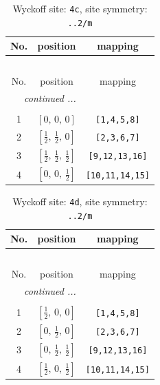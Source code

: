 \documentclass[fleqn,8pt]{jsarticle}
\begin{document}
\renewcommand{\arraystretch}{1.2}
\begin{longtable}{ccc}
\caption{Wyckoff site: {\tt 4c}, site symmetry: {\tt ..2/m}}
 \\
 \hline \hline
No. & position & mapping \\ \hline \endfirsthead

\multicolumn{2}{l}{\tablename\ \thetable{}} \\
 \hline \hline
No. & position & mapping \\ \hline \endhead

 \hline \hline
\multicolumn{2}{r}{\footnotesize\it continued ...} \\ \endfoot

 \hline \hline
\multicolumn{2}{r}{} \\ \endlastfoot

1 & $\left[ 0,\, 0,\, 0 \right]$ & {\tt [1,4,5,8]} \\ \hline
2 & $\left[ \frac{1}{2},\, \frac{1}{2},\, 0 \right]$ & {\tt [2,3,6,7]} \\ \hline
3 & $\left[ \frac{1}{2},\, \frac{1}{2},\, \frac{1}{2} \right]$ & {\tt [9,12,13,16]} \\ \hline
4 & $\left[ 0,\, 0,\, \frac{1}{2} \right]$ & {\tt [10,11,14,15]} \\
\end{longtable}
\renewcommand{\arraystretch}{1.2}
\begin{longtable}{ccc}
\caption{Wyckoff site: {\tt 4d}, site symmetry: {\tt ..2/m}}
 \\
 \hline \hline
No. & position & mapping \\ \hline \endfirsthead

\multicolumn{2}{l}{\tablename\ \thetable{}} \\
 \hline \hline
No. & position & mapping \\ \hline \endhead

 \hline \hline
\multicolumn{2}{r}{\footnotesize\it continued ...} \\ \endfoot

 \hline \hline
\multicolumn{2}{r}{} \\ \endlastfoot

1 & $\left[ \frac{1}{2},\, 0,\, 0 \right]$ & {\tt [1,4,5,8]} \\ \hline
2 & $\left[ 0,\, \frac{1}{2},\, 0 \right]$ & {\tt [2,3,6,7]} \\ \hline
3 & $\left[ 0,\, \frac{1}{2},\, \frac{1}{2} \right]$ & {\tt [9,12,13,16]} \\ \hline
4 & $\left[ \frac{1}{2},\, 0,\, \frac{1}{2} \right]$ & {\tt [10,11,14,15]} \\
\end{longtable}
\end{document}
